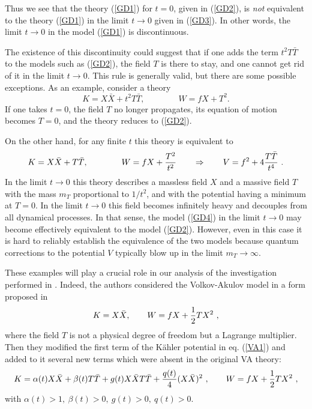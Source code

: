 \documentclass[11pt]{article}
\newcommand{\be}{\begin{equation}}
\newcommand{\ee}{\end{equation}}
\def\K{K{\"a}hler }
\newcommand{\rf}[1]{(\ref{#1})}
\def\be{\begin{equation}}
\def\ee{\end{equation}}
\begin{document}
Thus we see that the theory \rf{GD1}  for $t = 0$, given in  \rf{GD2}, is {\it not} equivalent to the theory \rf{GD1} in the  limit $ t\to 0$ given in \rf{GD3}. In other words, the limit $ t\to 0$ in the model \rf{GD1} is discontinuous.  

The existence of this discontinuity could suggest that if one adds  the term $ t^{2} T  {\bar T}$ to the models such as \rf{GD2}, the field $T$ is there to stay, and one cannot get rid of it in the limit $t\to 0$. This rule is generally valid, but there are some possible exceptions. As an example, consider  a theory 
\be
K=  X  {\bar X} +  t^{2} T  {\bar T},  \qquad \qquad W   =   f X + T^{2}.
\label{GD4} 
\ee
If one takes $t= 0$, the field $T$ no longer propagates, its equation of motion becomes $T=0$, and the theory reduces to \rf{GD2}.

On the other hand, for any finite $t$ this theory is equivalent to
\be
K=  X  {\bar X} +  T  {\bar T},  \qquad \qquad W   =   f X + {T^{2}\over t^{2} } \qquad \Rightarrow \qquad V= f^2 + 4 {T\bar T\over t^4}\ .
\label{GD5} 
\ee
In the limit $t\to 0$ this theory describes a massless field $X$ and a massive field $T$ with the mass $m_{T}$ proportional to $1/t^{2}$, and with the potential having a minimum at $T = 0$. In the limit $t\to 0$ this field becomes infinitely heavy  and decouples from all dynamical processes. In that  sense,  the model \rf{GD4} in the limit $t\to 0$ may become  effectively equivalent to the model \rf{GD2}. However, even in this case it is hard to reliably establish  the equivalence of the two models  because quantum corrections to the potential $V$ typically blow up in the limit $m_{T} \to \infty$.



These examples will play a crucial role in our analysis of the investigation performed in \cite{DallAgata:2022abm}. Indeed, the authors considered the Volkov-Akulov model \cite{Volkov:1973ix} in a form proposed  in \cite{Komargodski:2009rz}
\be
K=  X  {\bar X} , \qquad W=  fX + {1\over 2} TX^2\ ,
\label{VA1} \ee
where the field $T$ is not a physical degree of freedom but a Lagrange multiplier.
Then they  modified the  first term of the \K potential in eq. \rf{VA1} and 
added to it several new terms which were absent in the original VA theory: 
\be
K= \alpha(t)  X  {\bar X} +   \beta(t)  T  {\bar T} + g(t)  X\bar X T\bar T + {q(t)\over 4}( X\bar X)^2\ , \qquad W=  fX + {1\over 2} TX^2\  ,
\label{GD} \ee
with   $\alpha(t) >1 ,\  \beta(t) > 0, \  g(t) > 0,  \   q(t) >0$. 
\end{document}
